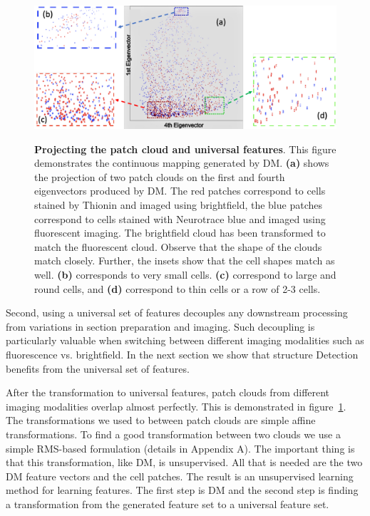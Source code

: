 \documentclass[runningheads]{llncs}
\begin{document}
\begin{figure} [t]
  \includegraphics[width=\textwidth]{Images/Scatter.png}
\label{fig:diffusionmap}
\caption{{\bf Projecting the patch cloud and universal features}. This
  figure demonstrates the continuous mapping generated by DM. {\bf
    (a)} shows the projection of two patch clouds on the first and
  fourth eigenvectors produced by DM. The red patches correspond to
  cells stained by Thionin and imaged using brightfield, the blue
  patches correspond to cells stained with Neurotrace blue and imaged
  using fluorescent imaging. The brightfield cloud has been
  transformed to match the fluorescent cloud. Observe that the shape
  of the clouds match closely. Further, the insets show that the cell
  shapes match as well.  {\bf (b)} corresponds to very
  small cells. {\bf (c)} correspond to large and round cells, and {\bf
    (d)} correspond to thin cells or a row  of 2-3 cells.}
\end{figure}
Second, using a universal set of features decouples any downstream processing from
variations in section preparation and imaging. Such decoupling is particularly
valuable when switching between different imaging modalities such as
fluorescence vs. brightfield. In the next section we show that
structure Detection benefits from the universal set of features.

After the transformation to universal features, patch clouds from
different imaging modalities overlap almost perfectly. This is
demonstrated in figure~\ref{fig:diffusionmap}. 
The transformations we used to between patch clouds are simple affine
transformations. To find a good transformation between two clouds we
use a simple RMS-based formulation (details in Appendix A). The
important thing is that this transformation, like DM, is
unsupervised. All that is needed are the two DM feature vectors and
the cell patches. The result is an unsupervised learning method for
learning features. The first step is DM and the second step is finding
a transformation from the generated feature set to a universal feature
set.
\end{document}
